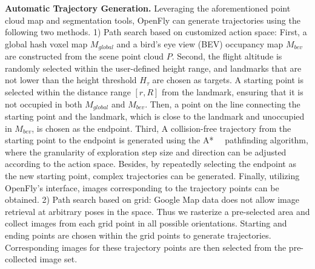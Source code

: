 \textbf{Automatic Trajectory Generation.}
Leveraging the aforementioned point cloud map and segmentation tools, OpenFly can generate trajectories using the following two methods. 
1) Path search based on customized action space: First, a global hash voxel map $M_{global}$ and a bird's eye view (BEV) occupancy map $M_{bev}$ are constructed from the scene point cloud $P$.
Second, the flight altitude is randomly selected within the user-defined height range, and landmarks that are not lower than the height threshold $H_{\tau}$ are chosen as targets. A starting point is selected within the distance range $[r, R]$ from the landmark, ensuring that it is not occupied in both $M_{global}$ and $M_{bev}$. Then, a point on the line connecting the starting point and the landmark, which is close to the landmark and unoccupied in $M_{bev}$, is chosen as the endpoint. 
Third, A collision-free trajectory from the starting point to the endpoint is generated using the A*~~\cite{astar} pathfinding algorithm, where the granularity of exploration step size and direction can be adjusted according to the action space. Besides, by repeatedly selecting the endpoint as the new starting point, complex trajectories can be generated. Finally, utilizing OpenFly's interface, images corresponding to the trajectory points can be obtained. 2) Path search based on grid: Google Map data does not allow image retrieval at arbitrary poses in the space. Thus we rasterize a pre-selected area and collect images from each grid point in all possible orientations. Starting and ending points are chosen within the grid points to generate trajectories. Corresponding images for these trajectory points are then selected from the pre-collected image set.





